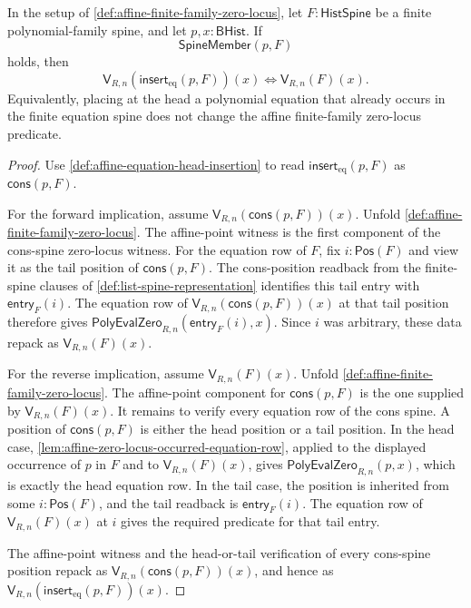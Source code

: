 \begin{theorem}
\label{thm:affine-duplicate-equation-insertion-invariance}
In the setup of \autoref{def:affine-finite-family-zero-locus}, let $F:\mathsf{HistSpine}$ be a finite polynomial-family spine, and let $p,x:\mathsf{BHist}$. If
$$
\mathsf{SpineMember}(p,F)
$$
holds, then
$$
\mathsf{V}_{R,n}(\mathsf{insert}_{\mathrm{eq}}(p,F))(x)
\Longleftrightarrow
\mathsf{V}_{R,n}(F)(x).
$$
Equivalently, placing at the head a polynomial equation that already occurs in the finite equation spine does not change the affine finite-family zero-locus predicate.
\end{theorem}
\begin{proof}
Use \autoref{def:affine-equation-head-insertion} to read $\mathsf{insert}_{\mathrm{eq}}(p,F)$ as $\mathsf{cons}(p,F)$.

For the forward implication, assume $\mathsf{V}_{R,n}(\mathsf{cons}(p,F))(x)$. Unfold \autoref{def:affine-finite-family-zero-locus}. The affine-point witness is the first component of the cons-spine zero-locus witness. For the equation row of $F$, fix $i:\mathsf{Pos}(F)$ and view it as the tail position of $\mathsf{cons}(p,F)$. The cons-position readback from the finite-spine clauses of \autoref{def:list-spine-representation} identifies this tail entry with $\mathsf{entry}_{F}(i)$. The equation row of $\mathsf{V}_{R,n}(\mathsf{cons}(p,F))(x)$ at that tail position therefore gives $\mathsf{PolyEvalZero}_{R,n}(\mathsf{entry}_{F}(i),x)$. Since $i$ was arbitrary, these data repack as $\mathsf{V}_{R,n}(F)(x)$.

For the reverse implication, assume $\mathsf{V}_{R,n}(F)(x)$. Unfold \autoref{def:affine-finite-family-zero-locus}. The affine-point component for $\mathsf{cons}(p,F)$ is the one supplied by $\mathsf{V}_{R,n}(F)(x)$. It remains to verify every equation row of the cons spine. A position of $\mathsf{cons}(p,F)$ is either the head position or a tail position. In the head case, \autoref{lem:affine-zero-locus-occurred-equation-row}, applied to the displayed occurrence of $p$ in $F$ and to $\mathsf{V}_{R,n}(F)(x)$, gives $\mathsf{PolyEvalZero}_{R,n}(p,x)$, which is exactly the head equation row. In the tail case, the position is inherited from some $i:\mathsf{Pos}(F)$, and the tail readback is $\mathsf{entry}_{F}(i)$. The equation row of $\mathsf{V}_{R,n}(F)(x)$ at $i$ gives the required predicate for that tail entry.

The affine-point witness and the head-or-tail verification of every cons-spine position repack as $\mathsf{V}_{R,n}(\mathsf{cons}(p,F))(x)$, and hence as $\mathsf{V}_{R,n}(\mathsf{insert}_{\mathrm{eq}}(p,F))(x)$.
\end{proof}

